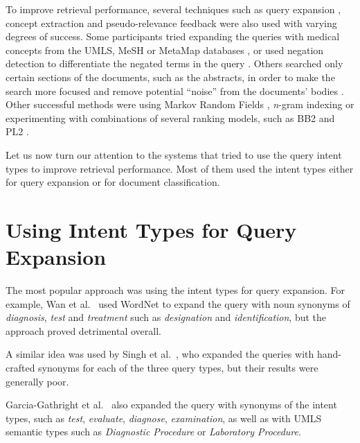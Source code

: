 To improve retrieval performance, several techniques such as
query expansion \cite{mutrec, sankhavara2014fusing, cuhk, CSEIITV, ucla, udel, duth, ir.cs.sfsu, goodwin2014utd, oh2014kisti},
concept extraction \cite{ir.cs.sfsu, ucla, bitem, goodwin2014utd, oh2014kisti}
and pseudo-relevance feedback \cite{novasearch, waterloo, mutrec, oh2014kisti, choi, dinh2014crp}
were also used with varying degrees of success.
Some participants tried expanding the queries with medical concepts
from the UMLS, MeSH or MetaMap databases \cite{lamda2015, ucla, udel, bitem, novasearch},
or used negation detection to differentiate the negated terms in the query
\cite{wing2014query, wei2014atigeo, ucla, oh2014kisti}.
Others searched only certain sections of the documents, such as the abstracts, in order to make the search more focused
and remove potential ``noise'' from the documents' bodies \cite{ucla}.
Other successful methods were using Markov Random Fields \cite{wsuir},
\emph{n}-gram indexing \cite{xu2014hltcoe}
or experimenting with combinations of several ranking models,
such as BB2 and PL2 \cite{song2015ecnu}.

Let us now turn our attention to the systems that tried to use the query intent types to improve retrieval performance.
Most of them used the intent types either for query expansion or for document classification.

\section{Using Intent Types for Query Expansion}

The most popular approach was using the intent types for query expansion.
For example, Wan et al.\ \cite{cuhk} used WordNet to expand the query with noun synonyms
of \emph{diagnosis}, \emph{test} and \emph{treatment} such as \emph{designation} and \emph{identification},
but the approach proved detrimental overall.

A similar idea was used by Singh et al.\ \cite{CSEIITV}, who expanded the queries with hand-crafted synonyms
for each of the three query types, but their results were generally poor.

Garcia-Gathright et al.\ \cite{ucla} also expanded the query with synonyms of the intent types, such as \emph{test}, \emph{evaluate},
\emph{diagnose}, \emph{examination}, as well as with UMLS semantic types such as \emph{Diagnostic Procedure}
or \emph{Laboratory Procedure}.

